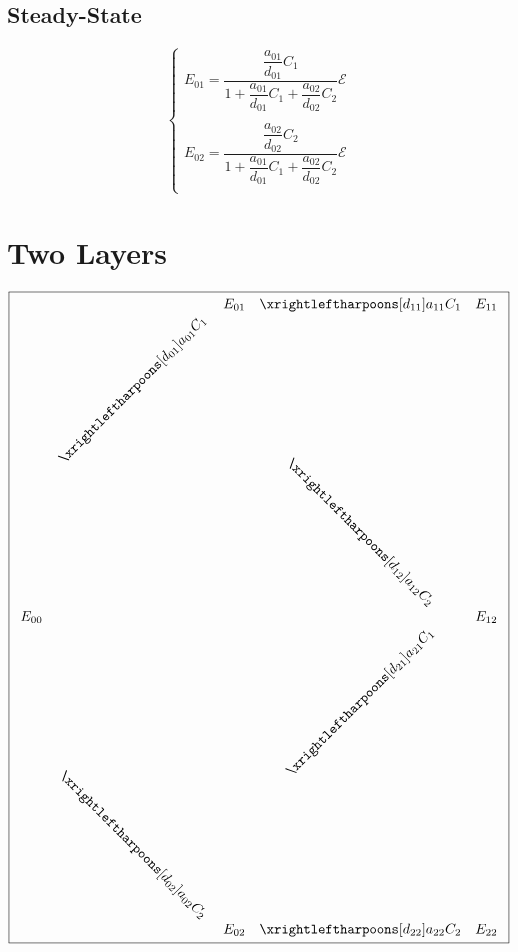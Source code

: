 \documentclass[aps,onecolumn,12pt]{revtex4}
\begin{document}
\subsection{Steady-State}

\begin{equation}
\left\lbrace
\begin{array}{rcl}
E_{01} = \dfrac{ \dfrac{a_{01}}{d_{01}} C_1 }{1+ \dfrac{a_{01}}{d_{01}} C_1  + \dfrac{a_{02}}{d_{02}} C_2  } \mathcal{E}\\
\\
E_{02} = \dfrac{ \dfrac{a_{02}}{d_{02}} C_2  }{1+ \dfrac{a_{01}}{d_{01}} C_1  + \dfrac{a_{02}}{d_{02}} C_2  } \mathcal{E}\\
\end{array}
\right.
\end{equation}


\section{Two Layers}

\begin{equation}
\boxed{
\begin{array}{ccccc}
 & & E_{01} & \xrightleftharpoons[d_{11}]{a_{11}C_1} & E_{11}\\
 &  \rotatebox{45}{$\xrightleftharpoons[d_{01}]{a_{01}C_1}$} &   & \rotatebox{-45}{$\xrightleftharpoons[d_{12}]{a_{12}C_2}$} & \\
E_{00} & &  & & E_{12}\\ 
  & \rotatebox{-45}{$\xrightleftharpoons[d_{02}]{a_{02}C_2}$} &  & \rotatebox{45}{$\xrightleftharpoons[d_{21}]{a_{21}C_1}$} &  \\
  & & E_{02} & \xrightleftharpoons[d_{22}]{a_{22}C_2} & E_{22}\\
 \end{array}
 }
\end{equation}
\end{document}
